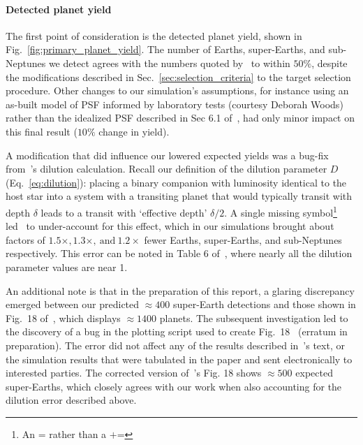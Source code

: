 \paragraph{Detected planet yield}
The first point of consideration is the detected planet yield, shown in Fig.~\ref{fig:primary_planet_yield}.
The number of Earths, super-Earths, and sub-Neptunes we detect agrees with the 
numbers quoted by~ to within $50\%$, despite the 
modifications described in Sec.~\ref{sec:selection_criteria} to the target 
selection procedure.
Other changes to our simulation's assumptions, for instance using an as-built 
model of \tesss PSF informed by laboratory tests (courtesy Deborah Woods) 
rather than the idealized PSF described in Sec 6.1 
of~, had only minor impact on this final result 
($10\%$ change in yield).

A modification that did influence our lowered expected yields was a bug-fix 
from~'s dilution calculation. Recall our definition 
of 
the dilution parameter $D$ (Eq.~\ref{eq:dilution}): placing a binary companion 
with luminosity identical to the host star into a system with a transiting 
planet that would typically transit with depth $\delta$ leads to a transit with 
`effective depth' $\delta/2$. A single missing symbol\footnote{An $\texttt{=}$ rather than 
a $\texttt{+=}$} led~ to under-account for this 
effect, which 
in our simulations brought about factors of $1.5\times, 1.3\times,\ 
\mathrm{and}\ 1.2\times$ fewer Earths, super-Earths, and sub-Neptunes 
respectively. This error can be noted in Table 6 
of~, where nearly all the dilution parameter 
values are near 1.


An additional note is that in the preparation of this report, a glaring 
discrepancy emerged between our predicted $\approx 400$ super-Earth detections 
and those shown in Fig.~18 of~\citetalias{Sullivan_2015}, which 
displays $\approx 1400$ planets. The subsequent investigation led to the 
discovery of a bug in the plotting script used to create 
Fig.~18~ (erratum in preparation). The 
error did not
affect any of the results described in~'s text, or 
the simulation results that were tabulated in the paper and sent electronically 
to interested parties.
The corrected version 
of~'s Fig. 18 shows $\approx 500$ expected 
super-Earths, which closely agrees with our work when also accounting for the 
dilution error described above.


